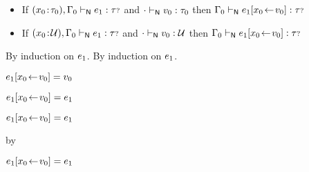 \begin{lemma}\label{H-type-substitution}\leavevmode
  \begin{itemize}
    \item
      If\/ $(x_0\!:\!\tau_0),\Gamma_0 \vdash_{\mathsf{N}} e_1 : {\tau{\scriptstyle ?}}$
      and\/ ${\cdot} \vdash_{\mathsf{N}} v_0 : \tau_0$
      then\/ $\Gamma_0 \vdash_{\mathsf{N}} e_1[x_0\!\leftarrow\!v_0] : {\tau{\scriptstyle ?}}$
    \item
      If\/ $(x_0\!:\!{\mathcal U}),\Gamma_0 \vdash_{\mathsf{N}} e_1 : {\tau{\scriptstyle ?}}$
      and\/ ${\cdot} \vdash_{\mathsf{N}} v_0 : {\mathcal U}$
      then\/ $\Gamma_0 \vdash_{\mathsf{N}} e_1[x_0\!\leftarrow\!v_0] : {\tau{\scriptstyle ?}}$
  \end{itemize}
\end{lemma}{
  \newcommand{\shortpf}{By induction on $\sexpr_1$.}
\begin{lamportproof*}
  \shortpf
\mainproof
  \shortpf

    \begin{pfproof}
        \begin{pfproof}
          \qedstep
            \begin{pfproof}
              {$e_1[x_0\!\leftarrow\!v_0] = v_0$}
            \end{pfproof}
        \end{pfproof}
        \begin{pfproof}
          \qedstep
            \begin{pfproof}
              {$e_1[x_0\!\leftarrow\!v_0] = e_1$}
            \end{pfproof}
        \end{pfproof}
    \end{pfproof}

    \begin{pfproof}
      \qedstep
        \begin{pfproof}
          {$e_1[x_0\!\leftarrow\!v_0] = e_1$}
        \end{pfproof}
    \end{pfproof}

    \begin{pfproof}
        \begin{pfproof}
          \qedstep
            \begin{pfproof}
              by \pfih
            \end{pfproof}
        \end{pfproof}
        \begin{pfproof}
          \qedstep
            \begin{pfproof}
              {$e_1[x_0\!\leftarrow\!v_0] = e_1$}
            \end{pfproof}
        \end{pfproof}
    \end{pfproof}


\end{lamportproof*}}

